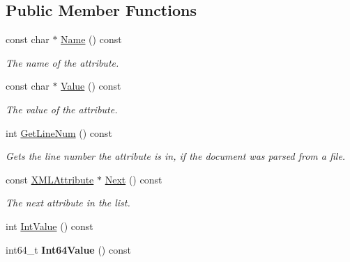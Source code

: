 \subsection*{Public Member Functions}
\begin{DoxyCompactItemize}
\item 
const char $\ast$ \hyperlink{classtinyxml2_1_1XMLAttribute_a8124fbfd27f57150cc68d8a9207078c3}{Name} () const \hypertarget{classtinyxml2_1_1XMLAttribute_a8124fbfd27f57150cc68d8a9207078c3}{}\label{classtinyxml2_1_1XMLAttribute_a8124fbfd27f57150cc68d8a9207078c3}

\begin{DoxyCompactList}\small\item\em The name of the attribute. \end{DoxyCompactList}\item 
const char $\ast$ \hyperlink{classtinyxml2_1_1XMLAttribute_aa9b08c6e592b0c88117c46666dcc1af2}{Value} () const \hypertarget{classtinyxml2_1_1XMLAttribute_aa9b08c6e592b0c88117c46666dcc1af2}{}\label{classtinyxml2_1_1XMLAttribute_aa9b08c6e592b0c88117c46666dcc1af2}

\begin{DoxyCompactList}\small\item\em The value of the attribute. \end{DoxyCompactList}\item 
int \hyperlink{classtinyxml2_1_1XMLAttribute_a1212dc99f974042d4a22cb36c408d611}{Get\+Line\+Num} () const \hypertarget{classtinyxml2_1_1XMLAttribute_a1212dc99f974042d4a22cb36c408d611}{}\label{classtinyxml2_1_1XMLAttribute_a1212dc99f974042d4a22cb36c408d611}

\begin{DoxyCompactList}\small\item\em Gets the line number the attribute is in, if the document was parsed from a file. \end{DoxyCompactList}\item 
const \hyperlink{classtinyxml2_1_1XMLAttribute}{X\+M\+L\+Attribute} $\ast$ \hyperlink{classtinyxml2_1_1XMLAttribute_a7fd852d6185af90361ec1bc9a7681ad6}{Next} () const \hypertarget{classtinyxml2_1_1XMLAttribute_a7fd852d6185af90361ec1bc9a7681ad6}{}\label{classtinyxml2_1_1XMLAttribute_a7fd852d6185af90361ec1bc9a7681ad6}

\begin{DoxyCompactList}\small\item\em The next attribute in the list. \end{DoxyCompactList}\item 
int \hyperlink{classtinyxml2_1_1XMLAttribute_a949d02a5888092cc68c1e29185301863}{Int\+Value} () const 
\item 
int64\+\_\+t {\bfseries Int64\+Value} () const \hypertarget{classtinyxml2_1_1XMLAttribute_ad73b728250aadecaf367ac54683f8a79}{}\label{classtinyxml2_1_1XMLAttribute_ad73b728250aadecaf367ac54683f8a79}


\end{DoxyCompactItemize}
